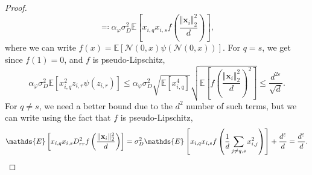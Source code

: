 \documentclass[letterpaper, 10pt, dvipsnames]{article}
\numberwithin{equation}{section}
\newcommand{\x}{\mathbf{x}}
\renewcommand{\phi}{\varphi}
\let\O\relax
\newcommand{\O}[1]{\mathcal{O}\left(#1\right)}
\newcommand{\E}{\mathds{E}}
\theoremstyle{definition}
\begin{document}
\begin{proof}
\[    \eqqcolon
    \alpha_\phi\sigma_D^2 \E\left[x_{i,q}x_{i,s}f\left(\frac{\Vert \x_i\Vert^2_2}{d}\right)\right],
    \]
    where we can write $f(x) = \E\left[\mathcal{N}(0,x)\psi(\mathcal{N}(0,x))\right]$. For $q = s$, we get since $f(1)=0$, and $f$ is pseudo-Lipschitz, 
    \[
    \alpha_\phi\sigma_D^2 \E\left[x_{i,q}^2z_{i,r}\psi(z_{i,r})\right]
    \leqslant 
    \alpha_\phi \sigma_D^2 \sqrt{\E\left[x_{i,q}^4\right]}\sqrt{\E\left[f\left(\frac{\Vert \x_i\Vert_2^2}{d}\right)^2\right]}\leqslant \frac{d^{2\varepsilon}}{\sqrt{d}}. 
    \] 
    For $q\neq s$, we need a better bound due to the $d^2$ number of such terms, but we can write using the fact that $f$ is pseudo-Lipschitz, 
    \[
      \E\left[
        x_{i,q}x_{i,s}D_{rr}^2 f\left(\frac{\Vert \x_i\Vert_2^2}{d}\right)
      \right] 
      = 
      \sigma_D^2 \E\left[
        x_{i,q}x_{i,s} f\left(\frac{1}{d}\sum_{j\neq q,s}x_{i,j}^2\right)
      \right]
      +
      \O{\frac{d^\varepsilon}{d}}
      =
    \O{\frac{d^\varepsilon}{d}}.
    \]


\end{proof}
\end{document}
